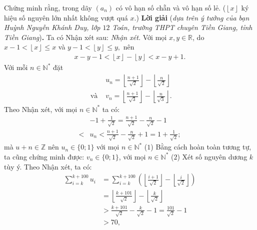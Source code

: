\begin{multicols}{2}
	Chứng minh rằng, trong dãy $\left(a_n\right)$  có vô hạn số chẵn và vô hạn số lẻ.
	\vskip 0.1cm
	($\left\lfloor x \right\rfloor $  ký hiệu số nguyên lớn nhất không vượt quá $x$.)
	\vskip 0.05cm
	\textbf{\color{thachthuctoanhoc}Lời giải} (\textit{dựa trên ý tưởng của bạn Huỳnh Nguyễn Khánh Duy, lớp $12$ Toán, trường THPT chuyên Tiền Giang, tỉnh Tiền Giang})\textbf{\color{thachthuctoanhoc}.}
	\vskip 0.05cm
	Ta có Nhận xét sau:
	\vskip 0.05cm
	\textit{Nhận xét.} Với mọi  $x,y \in \mathbb{R}$, do $x - 1 < \left\lfloor x \right\rfloor  \le x$  và $y - 1 < \left\lfloor y \right\rfloor  \le y,$  nên
	\begin{align*}
		x - y - 1 < \left\lfloor x \right\rfloor  - \left\lfloor y \right\rfloor  < x - y + 1.
	\end{align*}
	Với mỗi $n \in \mathbb{N^*}$  đặt
	\begin{align*}
		&{u_n} = \left\lfloor {\frac{{n + 1}}{{\sqrt 2 }}} \right\rfloor  - \left\lfloor {\frac{n}{{\sqrt 2 }}} \right\rfloor \\
		\text{ và } &{v_n} = \left\lfloor {\frac{{n + 1}}{{\sqrt 3 }}} \right\rfloor  - \left\lfloor {\frac{n}{{\sqrt 3 }}} \right\rfloor .
	\end{align*}  
	Theo Nhận xét, với mọi $n \in \mathbb{N^*}$  ta có:
	\begin{align*}
		&- 1 + \frac{1}{{\sqrt 2 }} = \frac{{n + 1}}{{\sqrt 2 }} - \frac{n}{{\sqrt 2 }} - 1 \\
		< &{u_n} < \frac{{n + 1}}{{\sqrt 2 }} - \frac{n}{{\sqrt 2 }} + 1 = 1 + \frac{1}{{\sqrt 2 }};
	\end{align*}
	mà $u+n \in \mathbb{Z}$  nên $u_n \in \{0;1\}$  với mọi  $n \in \mathbb{N^*}$ \hfill ($1$)
	\vskip 0.05cm
	Bằng cách hoàn toàn tương tự, ta cũng chứng minh được: $v_n \in \{0;1\}$,  với mọi \linebreak$n \in \mathbb{N^*}$ \hfill     ($2$)
	\vskip 0.05cm
	Xét số nguyên dương $k$ tùy ý.
	\vskip 0.05cm
	Theo Nhận xét, ta có:
	\begin{align*}
		\sum\limits_{i = k}^{k + 100} {{u_i}}  &= \sum\limits_{i = k}^{k + 100} {\left( {\left\lfloor {\frac{{i + 1}}{{\sqrt 2 }}} \right\rfloor  - \left\lfloor {\frac{i}{{\sqrt 2 }}} \right\rfloor } \right)}  \\
		&= \left\lfloor {\frac{{k + 101}}{{\sqrt 2 }}} \right\rfloor  - \left\lfloor {\frac{k}{{\sqrt 2 }}} \right\rfloor  \\
		&> \frac{{k + 101}}{{\sqrt 2 }} - \frac{k}{{\sqrt 2 }} - 1 = \frac{{101}}{{\sqrt 2 }} - 1 \\
		&> 70, \tag{$3$}\\

\end{align*}
\end{multicols}
